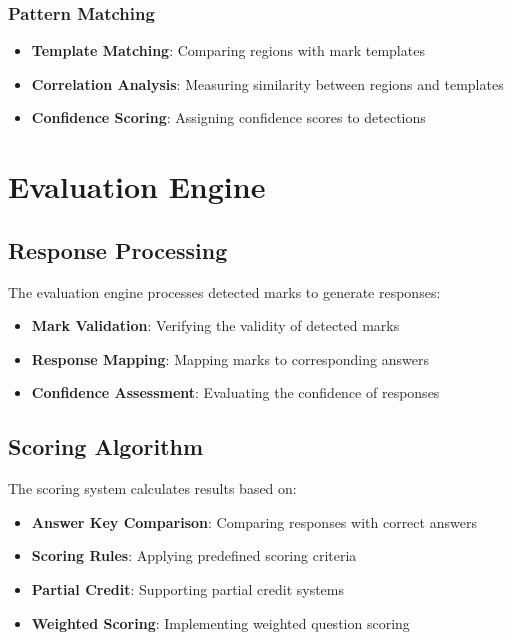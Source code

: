 \subsubsection{Pattern Matching}
\begin{itemize}
\item \textbf{Template Matching}: Comparing regions with mark templates
\item \textbf{Correlation Analysis}: Measuring similarity between regions and templates
\item \textbf{Confidence Scoring}: Assigning confidence scores to detections
\end{itemize}

\section{Evaluation Engine}

\subsection{Response Processing}

The evaluation engine processes detected marks to generate responses:

\begin{itemize}
\item \textbf{Mark Validation}: Verifying the validity of detected marks
\item \textbf{Response Mapping}: Mapping marks to corresponding answers
\item \textbf{Confidence Assessment}: Evaluating the confidence of responses
\end{itemize}

\subsection{Scoring Algorithm}

The scoring system calculates results based on:

\begin{itemize}
\item \textbf{Answer Key Comparison}: Comparing responses with correct answers
\item \textbf{Scoring Rules}: Applying predefined scoring criteria
\item \textbf{Partial Credit}: Supporting partial credit systems
\item \textbf{Weighted Scoring}: Implementing weighted question scoring
\end{itemize}

